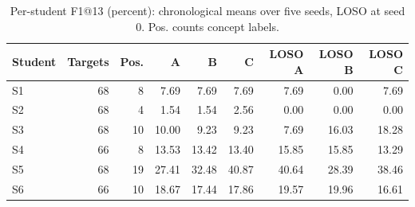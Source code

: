 \begin{table}[htbp]\centering\small
\caption{Per-student F1@13 (percent): chronological means over five seeds, LOSO at seed 0. Pos. counts concept labels.}\label{tab:students}
\begin{tabular}{@{}lrrrrrrrr@{}}\toprule
Student & Targets & Pos. & A & B & C & LOSO A & LOSO B & LOSO C\\\midrule
S1 & 68 & 8 & 7.69 & 7.69 & 7.69 & 7.69 & 0.00 & 7.69\\
S2 & 68 & 4 & 1.54 & 1.54 & 2.56 & 0.00 & 0.00 & 0.00\\
S3 & 68 & 10 & 10.00 & 9.23 & 9.23 & 7.69 & 16.03 & 18.28\\
S4 & 66 & 8 & 13.53 & 13.42 & 13.40 & 15.85 & 15.85 & 13.29\\
S5 & 68 & 19 & 27.41 & 32.48 & 40.87 & 40.64 & 28.39 & 38.46\\
S6 & 66 & 10 & 18.67 & 17.44 & 17.86 & 19.57 & 19.96 & 16.61\\
\bottomrule\end{tabular}\end{table}
